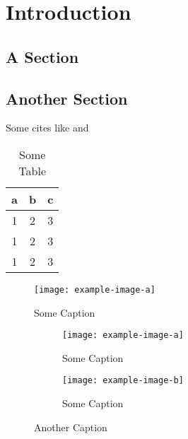 \chapter{Introduction}
\label{ch:intro}

\blindtext

\section{A Section}
\Blindtext

\section{Another Section}
\blindmathpaper
\Blindtext


Some cites like \cite{Hartley2004} and \cite{Bishop2006} 

\begin{table}[ht]
	\centering
	\begin{tabular}{c|c|c}
		a & b & c \\ \hline
		1 & 2 & 3 \\
		1 & 2 & 3 \\
		1 & 2 & 3
	\end{tabular}
	\caption{Some Table}
\end{table}

\begin{figure}[ht]
	\centering
	\texttt{[image: example-image-a]}
	\caption{Some Caption}
\end{figure}

\begin{figure}[ht]
	\centering
	\begin{subfigure}[b]{0.45\textwidth}
		\texttt{[image: example-image-a]}
		\caption{Some Caption}
	\end{subfigure} \hfill
	\begin{subfigure}[b]{0.45\textwidth}
		\texttt{[image: example-image-b]}
		\caption{Some Caption}
	\end{subfigure}
	\caption{Another Caption}
\end{figure}

